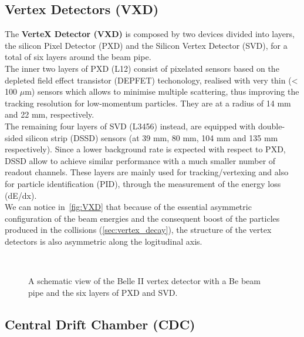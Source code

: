 \subsection{Vertex Detectors (VXD)}


The \textbf{VerteX Detector (VXD)} is composed by two devices divided into layers, the silicon Pixel Detector (PXD) and the Silicon Vertex Detector (SVD), for a total of six layers around the beam pipe.\\
The inner two layers of PXD (L12) consist of pixelated sensors based on the depleted field effect transistor (DEPFET) techonology, realised with very thin (< 100 $\mu$m) sensors which allows to minimise multiple scattering, thus improving the tracking resolution for low-momentum particles. They are at a radius of 14 mm and 22 mm, respectively. \\
The remaining four layers of SVD (L3456) instead, are equipped with double-sided silicon strip (DSSD) sensors (at 39 mm, 80 mm, 104 mm and 135 mm respectively). Since a lower background rate is expected with respect to PXD, DSSD allow to achieve similar performance with a much smaller number of readout channels.
These layers are mainly used for tracking/vertexing and also for particle identification (PID), through the measurement of the energy loss (dE/dx).\\

We can notice in~\autoref{fig:VXD} that because of the essential asymmetric configuration of the beam energies and the consequent boost of the particles produced in the collisions (\autoref{sec:vertex_decay}), the structure of the vertex detectors is also asymmetric along the logitudinal axis.

\begin{figure}[h!]
\centering
{}\quad
{}\\
\caption{A schematic view of the Belle II vertex detector with a Be beam pipe and the six layers of PXD and SVD.}
\label{fig:VXD}
\end{figure}


\subsection{Central Drift Chamber (CDC)}

